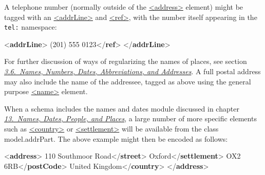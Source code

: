 A telephone number (normally outside of the \hyperref[TEI.address]{<address>} element) might be tagged with an \hyperref[TEI.addrLine]{<addrLine>} and \hyperref[TEI.ref]{<ref>}, with the number itself appearing in the \texttt{tel:} namespace: \par\bgroup{}\exampleFont \begin{shaded}\noindent\mbox{}{<\textbf{addrLine}>}\mbox{}\newline 
{}(201) 555 0123{</\textbf{ref}>}\mbox{}\newline 
{</\textbf{addrLine}>}\end{shaded}\egroup\par \par
For further discussion of ways of regularizing the names of places, see section \textit{\hyperref[CONA]{3.6.\ Names, Numbers, Dates, Abbreviations, and Addresses}}. A full postal address may also include the name of the addressee, tagged as above using the general purpose \hyperref[TEI.name]{<name>} element.\par
When a schema includes the names and dates module discussed in chapter \textit{\hyperref[ND]{13.\ Names, Dates, People, and Places}}, a large number of more specific elements such as \hyperref[TEI.country]{<country>} or \hyperref[TEI.settlement]{<settlement>} will be available from the class \textsf{model.addrPart}. The above example might then be encoded as follows: \par\bgroup{}\exampleFont \begin{shaded}\noindent\mbox{}{<\textbf{address}>}\mbox{}\newline 
{}110 Southmoor Road{</\textbf{street}>}\mbox{}\newline 
{}Oxford{</\textbf{settlement}>}\mbox{}\newline 
{}OX2 6RB{</\textbf{postCode}>}\mbox{}\newline 
{}United Kingdom{</\textbf{country}>}\mbox{}\newline 
{</\textbf{address}>}\end{shaded}\egroup\par 
